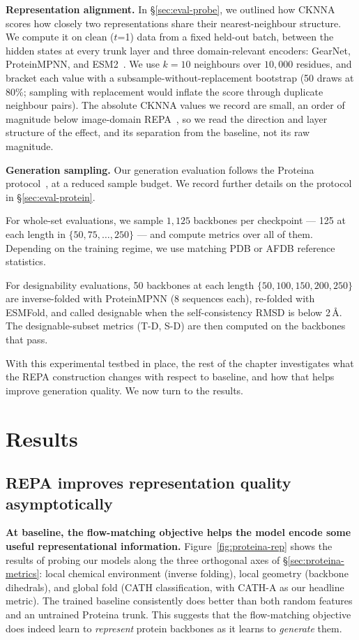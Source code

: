 \documentclass[12pt,a4paper,twoside]{report}
\begin{document}
\textbf{Representation alignment.} In \S\ref{sec:eval-probe}, we outlined how CKNNA scores how closely two representations share their nearest-neighbour structure. We compute it on clean ($t$=1) data from a fixed held-out batch, between the hidden states at every trunk layer and three domain-relevant encoders: GearNet, ProteinMPNN, and ESM2~\cite{ESM2}. We use $k{=}10$ neighbours over $10{,}000$ residues, and bracket each value with a subsample-without-replacement bootstrap (50 draws at 80\%; sampling with replacement would inflate the score through duplicate neighbour pairs). The absolute CKNNA values we record are small, an order of magnitude below image-domain REPA~\cite{REPA}, so we read the direction and layer structure of the effect, and its separation from the baseline, not its raw magnitude.

\textbf{Generation sampling.} Our generation evaluation follows the Proteina protocol~\cite{Proteina}, at a reduced sample budget. We record further details on the protocol in \S\ref{sec:eval-protein}.

For whole-set evaluations, we sample $1{,}125$ backbones per checkpoint --- 125 at each length in $\{50, 75, \dots, 250\}$ --- and compute metrics over all of them. Depending on the training regime, we use matching PDB or AFDB reference statistics.

For designability evaluations, 50 backbones at each length $\{50, 100, 150, 200, 250\}$ are inverse-folded with ProteinMPNN (8 sequences each), re-folded with ESMFold, and called designable when the self-consistency RMSD is below 2\,\AA{}. The designable-subset metrics (T-D, S-D) are then computed on the backbones that pass.

With this experimental testbed in place, the rest of the chapter investigates what the REPA construction changes with respect to baseline, and how that helps improve generation quality. We now turn to the results.

\section{Results}

\subsection{REPA improves representation quality asymptotically}
\label{sec:proteina-rep}

\textbf{At baseline, the flow-matching objective helps the model encode some useful representational information.} Figure~\ref{fig:proteina-rep} shows the results of probing our models along the three orthogonal axes of \S\ref{sec:proteina-metrics}: local chemical environment (inverse folding), local geometry (backbone dihedrals), and global fold (CATH classification, with CATH-A as our headline metric). The trained baseline consistently does better than both random features and an untrained Proteina trunk. This suggests that the flow-matching objective does indeed learn to \emph{represent} protein backbones as it learns to \emph{generate} them.
\end{document}
